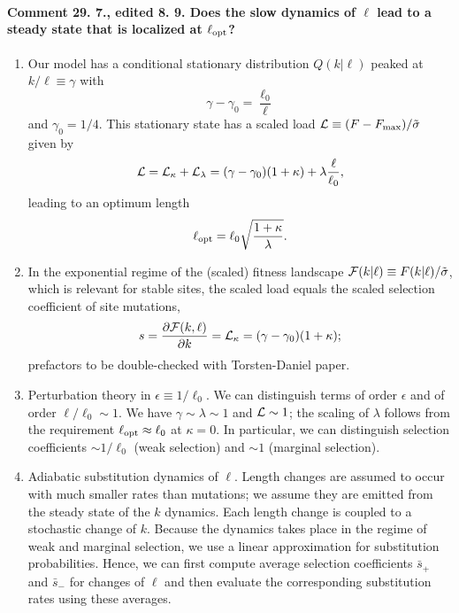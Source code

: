 \documentclass[10pt,a4paper]{article}
\newcommand{\ep}{\epsilon}
\renewcommand{\L}{{\cal L}}
\newcommand{\F}{{\cal F}}
\newcommand{\comment}[1]{{\noindent \color{blue} #1}}
\newcommand{\EQ}{\begin{equation}}
\newcommand{\EE}{\end{equation}}
\begin{document}
\comment{
\paragraph{Comment 29. 7., edited 8. 9. Does the slow dynamics of $\ell$ lead to a steady state that is localized at $\ell_{\rm opt}$?}
\begin{enumerate}
\item Our model has a conditional stationary distribution $Q(k|\ell)$ peaked at $k/\ell \equiv \gamma$ with
\EQ
\gamma - \gamma_0 = \frac{\ell_0}{\ell}
\EE
and $\gamma_0 = 1/4$. This stationary state has a scaled load $\L \equiv (F - F_{\max})/ \tilde \sigma$ given by
\EQ
\L = \L_\kappa + \L_\lambda = (\gamma - \gamma_0) (1 + \kappa) + \lambda  \frac{\ell}{\ell_0},
\EE
leading to an optimum length
\EQ
\ell_{\rm opt} = \ell_0 \sqrt{\frac{1+\kappa}{\lambda}}.
\EE

\item In the exponential regime of the (scaled) fitness landscape $\F(k |\ell) \equiv F(k|\ell) / \tilde \sigma$, which is relevant for stable sites, the scaled load equals the scaled selection coefficient of site mutations,
\EQ
s = \frac{\partial \F(k,\ell)}{\partial k} = \L_\kappa = (\gamma - \gamma_0) (1 + \kappa);
\EE
prefactors to be double-checked with Torsten-Daniel paper.

\item Perturbation theory in $\ep \equiv 1/\ell_0$. We can distinguish terms of order $\ep$ and of order $\ell/\ell_0 \sim 1$. We have $\gamma \sim \lambda \sim 1$ and $\L \sim 1$; the scaling of $\lambda$ follows from the requirement $\ell_{\rm opt} \approx \ell_0$ at $\kappa = 0$. In particular, we can distinguish selection coefficients $ \sim 1/\ell_0$ (weak selection) and $ \sim 1$ (marginal selection).

\item Adiabatic substitution dynamics of $\ell$. Length changes are assumed to occur with much smaller rates than mutations; we assume they are emitted from the steady state of the $k$ dynamics. Each length change is coupled to a stochastic change of $k$. Because the dynamics takes place in the regime of weak and marginal selection, we use a linear approximation for substitution probabilities. Hence, we can first compute average selection coefficients $\bar s_+$ and $\bar s_-$ for changes of $\ell$ and then evaluate the corresponding substitution rates using these averages.


\end{enumerate}}
\end{document}
